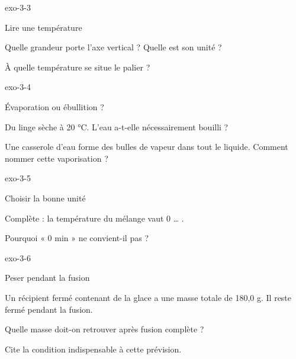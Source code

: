 \documentclass[12pt,twoside,openany]{book}
\begin{document}
\begin{blocLivre}{exo-3-3}
\begin{exercice}[1]{Lire une température}
\begin{questions}
\item Quelle grandeur porte l’axe vertical ? Quelle est son unité ?
\item À quelle température se situe le palier ?
\end{questions}
\end{exercice}\end{blocLivre}
\begin{blocLivre}{exo-3-4}
\begin{exercice}[1]{Évaporation ou ébullition ?}
\begin{questions}
\item Du linge sèche à 20 °C. L’eau a-t-elle nécessairement bouilli ?
\item Une casserole d’eau forme des bulles de vapeur dans tout le liquide. Comment nommer cette vaporisation ?
\end{questions}
\end{exercice}\end{blocLivre}
\begin{blocLivre}{exo-3-5}
\begin{exercice}[1]{Choisir la bonne unité}
\begin{questions}
\item Complète : la température du mélange vaut 0 … .
\item Pourquoi « 0 min » ne convient-il pas ?
\end{questions}
\end{exercice}\end{blocLivre}
\begin{blocLivre}{exo-3-6}
\begin{exercice}[2]{Peser pendant la fusion}
\begin{donnees}Un récipient fermé contenant de la glace a une masse totale de 180,0 g. Il reste fermé pendant la fusion.\par
\end{donnees}
\begin{questions}
\item Quelle masse doit-on retrouver après fusion complète ?
\item Cite la condition indispensable à cette prévision.
\end{questions}
\end{exercice}\end{blocLivre}
\end{document}
